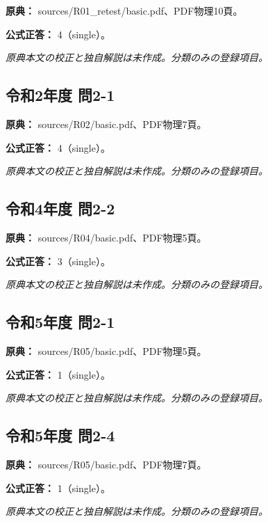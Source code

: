 \noindent\textbf{原典：} sources/R01\_retest/basic.pdf、PDF物理10頁。

\textbf{公式正答：} 4（single）。

\par\textit{原典本文の校正と独自解説は未作成。分類のみの登録項目。}

\subsection{令和2年度 問2-1}
\label{q:r02-reg-basic-2-1}

\noindent\textbf{原典：} sources/R02/basic.pdf、PDF物理7頁。

\textbf{公式正答：} 4（single）。

\par\textit{原典本文の校正と独自解説は未作成。分類のみの登録項目。}

\subsection{令和4年度 問2-2}
\label{q:r04-reg-basic-2-2}

\noindent\textbf{原典：} sources/R04/basic.pdf、PDF物理5頁。

\textbf{公式正答：} 3（single）。

\par\textit{原典本文の校正と独自解説は未作成。分類のみの登録項目。}

\subsection{令和5年度 問2-1}
\label{q:r05-reg-basic-2-1}

\noindent\textbf{原典：} sources/R05/basic.pdf、PDF物理5頁。

\textbf{公式正答：} 1（single）。

\par\textit{原典本文の校正と独自解説は未作成。分類のみの登録項目。}

\subsection{令和5年度 問2-4}
\label{q:r05-reg-basic-2-4}

\noindent\textbf{原典：} sources/R05/basic.pdf、PDF物理7頁。

\textbf{公式正答：} 1（single）。

\par\textit{原典本文の校正と独自解説は未作成。分類のみの登録項目。}

